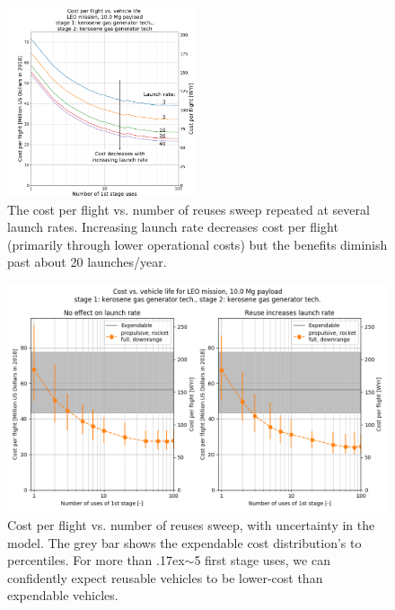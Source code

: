 \documentclass{iaf-iac}
\begin{document}
\begin{multicols}{2}
\begin{figure}[H]
    \centering
    \includegraphics[width=0.5\textwidth]{cpf_reuses_sweep_vary_launch_rate_annotated}
    \caption{\label{fig:cpf_reuses_sweep_vary_launch_rate} The cost per flight vs. number of reuses sweep repeated at several launch rates. Increasing launch rate decreases cost per flight (primarily through lower operational costs) but the benefits diminish past about 20 launches/year.}
\end{figure}

\begin{figure}
    \centering
    \includegraphics[width=\textwidth]{../../lvreuse/analysis/combined/plots/num_reuse_sweep_2_LEO_kerosene}
    \caption{\label{fig:num_reuse_sweep_LEO_kerosene} Cost per flight vs. number of reuses sweep, with uncertainty in the model. The grey bar shows the expendable cost distribution's  to  percentiles. For more than {\raise.17ex\hbox{$\scriptstyle\sim$}}5 first stage uses, we can confidently expect reusable vehicles to be lower-cost than expendable vehicles.}
\end{figure}


\end{multicols}
\end{document}
